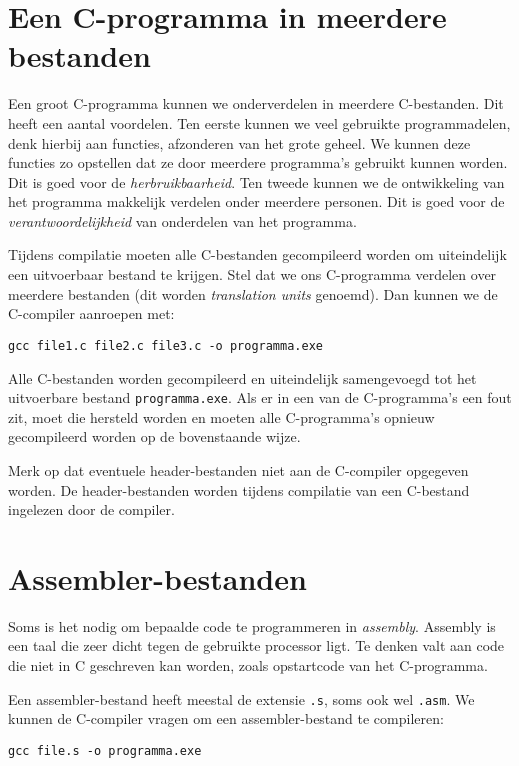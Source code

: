 \section{Een C-programma in meerdere bestanden}
Een groot C-programma kunnen we onderverdelen in meerdere C-bestanden. Dit heeft een aantal voordelen. Ten eerste kunnen we veel gebruikte programmadelen, denk hierbij aan functies, afzonderen van het grote geheel. We kunnen deze functies zo opstellen dat ze door meerdere programma's gebruikt kunnen worden. Dit is goed voor de \textsl{herbruikbaarheid}. Ten tweede kunnen we de ontwikkeling van het programma makkelijk verdelen onder meerdere personen. Dit is goed voor de \textsl{verantwoordelijkheid} van onderdelen van het programma. 

Tijdens compilatie moeten alle C-bestanden gecompileerd worden om uiteindelijk een uitvoerbaar bestand te krijgen. Stel dat we ons C-programma verdelen over meerdere bestanden (dit worden \textsl{translation units} genoemd). Dan kunnen we de C-compiler aanroepen met:

\hspace*{1em}\texttt{gcc file1.c file2.c file3.c -o programma.exe}

Alle C-bestanden worden gecompileerd en uiteindelijk samengevoegd tot het uitvoerbare bestand \texttt{programma.exe}.
Als er in een van de C-programma's een fout zit, moet die hersteld worden en moeten alle C-programma's opnieuw gecompileerd worden op de bovenstaande wijze.

Merk op dat eventuele header-bestanden niet aan de C-compiler opgegeven worden. De header-bestanden worden tijdens compilatie van een C-bestand ingelezen door de compiler.

\section{Assembler-bestanden}
Soms is het nodig om bepaalde code te programmeren in \textit{assembly}. Assembly is een taal die zeer dicht tegen de gebruikte processor ligt. Te denken valt aan code die niet in C geschreven kan worden, zoals opstartcode van het C-programma.

Een assembler-bestand heeft meestal de extensie \texttt{.s}, soms ook wel \texttt{.asm}. We kunnen de C-compiler vragen om een assembler-bestand te compileren:

\hspace*{1em}\texttt{gcc file.s -o programma.exe}

